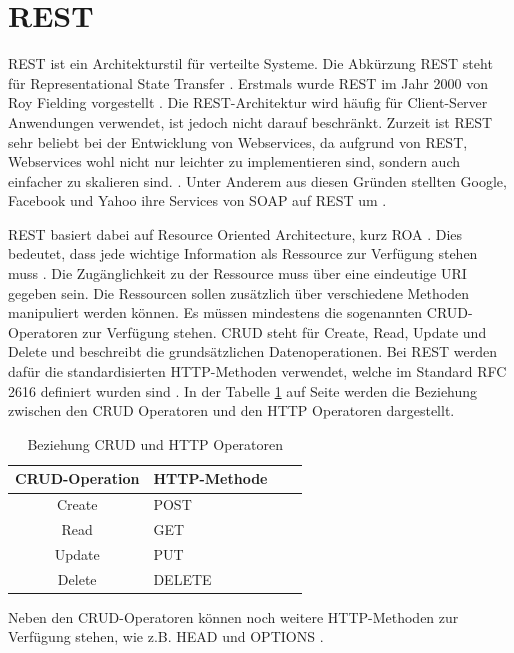 \documentclass{llncs}
\begin{document}
\section{REST}
REST ist ein Architekturstil für verteilte Systeme. Die Abkürzung REST steht für Representational State Transfer \cite{chakrabarti2009test}.
Erstmals wurde REST im Jahr 2000 von Roy Fielding vorgestellt \citep{kao2013performance}.
Die REST-Architektur wird häufig für Client-Server Anwendungen verwendet, ist jedoch nicht darauf beschränkt.
Zurzeit ist REST sehr beliebt bei der Entwicklung von Webservices, da aufgrund von REST, Webservices wohl nicht nur leichter zu implementieren sind, sondern auch einfacher zu skalieren sind. \cite{chakrabarti2009test}. 
Unter Anderem aus diesen Gründen stellten Google, Facebook und Yahoo ihre Services von SOAP auf REST um \cite{rodriguez2008restful, navas2014rest}.

REST basiert dabei auf Resource Oriented Architecture, kurz ROA \citep{chakrabarti2009test}. Dies bedeutet, dass jede wichtige Information als Ressource zur Verfügung stehen muss \cite{porres2011modeling}.
Die Zugänglichkeit zu der Ressource muss über eine eindeutige URI gegeben sein. Die Ressourcen sollen zusätzlich über verschiedene Methoden manipuliert werden können. Es müssen mindestens die sogenannten CRUD-Operatoren zur Verfügung stehen. CRUD steht für Create, Read, Update und Delete und beschreibt die grundsätzlichen Datenoperationen. Bei REST werden dafür die standardisierten HTTP-Methoden verwendet, welche im Standard RFC 2616 definiert wurden sind \citep{kao2013performance}. In der Tabelle \ref{tab:CRUD_HTTP_Methods} auf Seite \pageref{tab:CRUD_HTTP_Methods} werden die Beziehung zwischen den CRUD Operatoren und den HTTP Operatoren dargestellt.

\begin{table}[htbp]
\centering
\begin{tabular}{|c|l|p{4cm}|p{4cm}|}
\hline
\multicolumn{1}{|l|}{CRUD-Operation} & HTTP-Methode \\ \hline
Create & POST  \\ \hline
Read & GET \\ \hline
Update & PUT \\ \hline
Delete & DELETE \\ \hline
\end{tabular}
\caption{Beziehung CRUD und HTTP Operatoren \cite{reza2010framework}}
\label{tab:CRUD_HTTP_Methods}
\end{table}

Neben den CRUD-Operatoren können noch weitere HTTP-Methoden zur Verfügung stehen, wie z.B. HEAD und OPTIONS \cite{porres2011modeling}.
\end{document}
